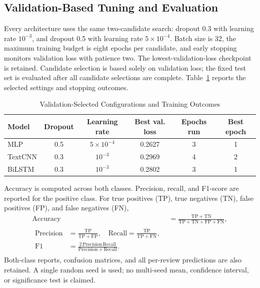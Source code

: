 \subsection{Validation-Based Tuning and Evaluation}
Every architecture uses the same two-candidate search: dropout 0.3 with learning rate $10^{-3}$, and dropout 0.5 with learning rate $5\times10^{-4}$. Batch size is 32, the maximum training budget is eight epochs per candidate, and early stopping monitors validation loss with patience two. The lowest-validation-loss checkpoint is retained. Candidate selection is based solely on validation loss; the fixed test set is evaluated after all candidate selections are complete. Table~\ref{tab:selected} reports the selected settings and stopping outcomes.

\begin{table}[tbp]
\fontsize{9}{10.2}\selectfont
\centering
\caption{Validation-Selected Configurations and Training Outcomes}
\label{tab:selected}
\setlength{\tabcolsep}{7pt}\renewcommand{\arraystretch}{1.12}
\begin{tabular}{lccccc}
\toprule
Model & Dropout & Learning rate & Best val. loss & Epochs run & Best epoch \\ \midrule
MLP & 0.5 & $5\times10^{-4}$ & 0.2627 & 3 & 1 \\
TextCNN & 0.3 & $10^{-3}$ & 0.2969 & 4 & 2 \\
BiLSTM & 0.3 & $10^{-3}$ & 0.2802 & 3 & 1 \\
\bottomrule
\end{tabular}
\end{table}

Accuracy is computed across both classes. Precision, recall, and F1-score are reported for the positive class. For true positives (TP), true negatives (TN), false positives (FP), and false negatives (FN),
\begin{align}
\mathrm{Accuracy}&=\frac{\mathrm{TP}+\mathrm{TN}}{\mathrm{TP}+\mathrm{TN}+\mathrm{FP}+\mathrm{FN}},\\
\begin{split}
\mathrm{Precision}&=\frac{\mathrm{TP}}{\mathrm{TP}+\mathrm{FP}},\quad
\mathrm{Recall}=\frac{\mathrm{TP}}{\mathrm{TP}+\mathrm{FN}},\\
\mathrm{F1}&=\frac{2\,\mathrm{Precision}\,\mathrm{Recall}}{\mathrm{Precision}+\mathrm{Recall}}.
\end{split}
\end{align}
Both-class reports, confusion matrices, and all per-review predictions are also retained. A single random seed is used; no multi-seed mean, confidence interval, or significance test is claimed.


